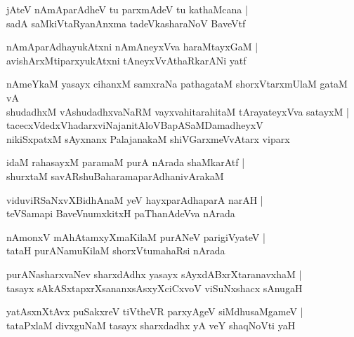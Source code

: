 \begin{shloka}
jAteV nAmAparAdheV tu parxmAdeV tu kathaMcana |\\
sadA saMkiVtaRyanAnxma tadeVkasharaNoV BaveVtf
\end{shloka}

\begin{shloka}
nAmAparAdhayukAtxni nAmAneyxVva haraMtayxGaM |\\
avishArxMtiparxyukAtxni tAneyxVvAthaRkarANi yatf
\end{shloka}

\begin{shloka}
nAmeYkaM yasayx cihanxM samxraNa pathagataM shorxVtarxmUlaM gataM vA \\
shudadhxM vAshudadhxvaNaRM vayxvahitarahitaM tArayateyxVva satayxM |\\
tacecxVdedxVhadarxviNajanitAloVBapASaMDamadheyxV\\
nikiSxpatxM sAyxnanx PalajanakaM shiVGarxmeVvAtarx viparx
\end{shloka}

\begin{shloka}
idaM rahasayxM paramaM purA nArada shaMkarAtf |\\
shurxtaM savARshuBaharamaparAdhanivArakaM
\end{shloka}

\begin{shloka}
viduviRSaNxvXBidhAnaM yeV hayxparAdhaparA narAH |\\
teVSamapi BaveVnumxkitxH paThanAdeVva nArada
\end{shloka}

\begin{shloka}
nAmonxV mAhAtamxyXmaKilaM purANeV parigiVyateV |\\
tataH purANamuKilaM shorxVtumahaRsi nArada
\end{shloka}

\begin{shloka}
purANasharxvaNev sharxdAdhx yasayx sAyxdABxrXtaranavxhaM |\\
tasayx sAkASxtapxrXsananxsAsxyXciCxvoV viSuNxshacx sAnugaH
\end{shloka}

\begin{shloka}
yatAsxnXtAvx puSakxreV tiVtheVR parxyAgeV siMdhusaMgameV |\\
tataPxlaM divxguNaM tasayx sharxdadhx yA veY shaqNoVti yaH
\end{shloka}

